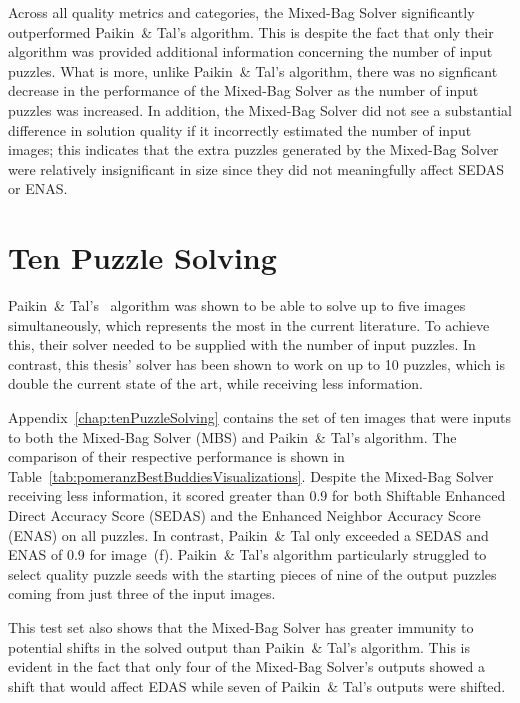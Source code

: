Across all quality metrics and categories, the Mixed-Bag Solver significantly outperformed Paikin~\& Tal's algorithm.  This is despite the fact that only their algorithm was provided additional information concerning the number of input puzzles.  What is more, unlike Paikin~\& Tal's algorithm, there was no signficant decrease in the performance of the Mixed-Bag Solver as the number of input puzzles was increased.  In addition, the Mixed-Bag Solver did not see a substantial difference in solution quality if it incorrectly estimated the number of input images; this indicates that the extra puzzles generated by the Mixed-Bag Solver were relatively insignificant in size since they did not meaningfully affect SEDAS or ENAS.  

\section{Ten Puzzle Solving}

Paikin~\& Tal's~\cite{paikin2015} algorithm was shown to be able to solve up to five images simultaneously, which represents the most in the current literature.  To achieve this, their solver needed to be supplied with the number of input puzzles.  In contrast, this thesis' solver has been shown to work on up to 10 puzzles, which is double the current state of the art, while receiving less information.

Appendix~\ref{chap:tenPuzzleSolving} contains the set of ten images that were inputs to both the Mixed-Bag Solver (MBS) and Paikin~\& Tal's algorithm.  The comparison of their respective performance is shown in Table~\ref{tab:pomeranzBestBuddiesVisualizations}.  Despite the Mixed-Bag Solver receiving less information, it scored greater than 0.9 for both Shiftable Enhanced Direct Accuracy Score (SEDAS) and the Enhanced Neighbor Accuracy Score (ENAS) on all puzzles.  In contrast, Paikin~\& Tal only exceeded a SEDAS and ENAS of 0.9 for image~(f). Paikin~\& Tal's algorithm particularly struggled to select quality puzzle seeds with the starting pieces of nine of the output puzzles coming from just three of the input images.

This test set also shows that the Mixed-Bag Solver has greater immunity to potential shifts in the solved output than Paikin~\& Tal's algorithm.  This is evident in the fact that only four of the Mixed-Bag Solver's outputs showed a shift that would affect EDAS while seven of Paikin~\& Tal's outputs were shifted.

